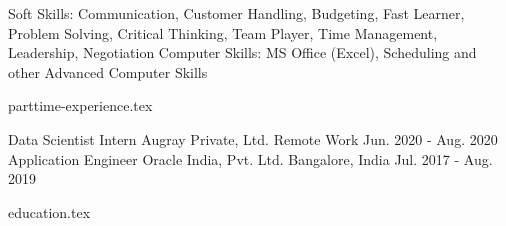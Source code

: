\documentclass[12pt, a4paper]{awesome-cv}
\newcommand*{\sectiondir}{resume/}
\newcounter{part_time}
\begin{document}
\makecvheader

\vspace{-1.5ex}
\begin{cventries}
\end{cventries}

\begin{cvskills}
    \cvskill
        {Soft Skills:}
        {Communication, Customer Handling, Budgeting, Fast Learner, Problem Solving, Critical Thinking, Team Player,}
    \cvskill
        {}
        {Time Management, Leadership, Negotiation}
    \cvskill
        {Computer Skills:}
        {MS Office (Excel), Scheduling and other Advanced Computer Skills}
\end{cvskills}

{parttime-experience.tex}

\vspace{-2.0ex}
\begin{cventries}
\cventry
    {Data Scientist Intern}
    {Augray Private, Ltd.}
    {Remote Work}
    {Jun. 2020 - Aug. 2020}
    {}
\cventry
    {Application Engineer}
    {Oracle India, Pvt. Ltd.}
    {Bangalore, India}
    {Jul. 2017 - Aug. 2019}
    {}
\end{cventries}

\vspace{-2.0ex}
{education.tex}
\end{document}
